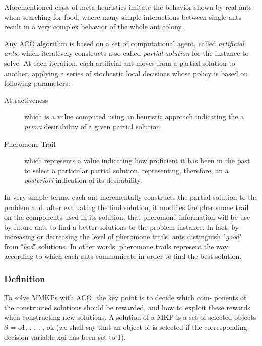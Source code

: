 \documentclass[12pt,a4paper]{report}
\theoremstyle{definition}
\begin{document}
Aforementioned class of meta-heuristics imitate the behavior shown by real ants when searching for food, where many simple interactions between single ants result in a very complex behavior of the whole ant colony.

Any ACO algorithm is based on a set of computational agent, called \textit{artificial ants}, which iteratively constructs a so-called  \textit{partial solution} for the instance to solve. At each iteration, each artificial ant moves from a partial solution to another, applying a series of stochastic local decisions whose policy is based on following parameters:

\begin{description}
	\item[Attractiveness] which is a value computed using an heuristic approach indicating the a \textit{priori} desirability of a given partial solution.
	
	\item[Pheromone Trail] which represents a value indicating how proficient it has been in the past to select a particular partial solution, representing, therefore, an a \textit{posteriori} indication of its desirability.
\end{description} 

In very simple terms, each ant incrementally constructs the partial solution to the problem and, after evaluating the find solution, it modifies the pheromone trail on the components used in its solution; that pheromone information will be use by future ants to find a better solutions to the problem instance. In fact, by increasing or decreasing the level of pheromone trails, ants distinguish "\textit{good}" from "\textit{bad}" solutions. In other words, pheromone trails represent the way according to which each ants communicate in order to find the best solution.
 
\subsubsection{Definition}

To solve MMKPs with ACO, the key point is to decide which com-
ponents of the constructed solutions should be rewarded, and how to
exploit these rewards when constructing new solutions. A solution of a
MKP is a set of selected objects S = {o1, . . . , ok } (we shall say that an
object oi is selected if the corresponding decision variable xoi has been
set to 1). 
\end{document}
